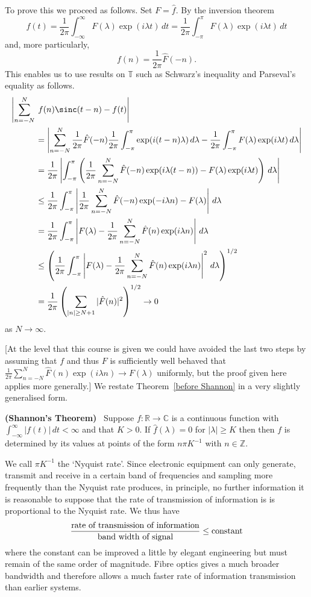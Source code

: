 To prove this we proceed as follows. Set $F=\hat{f}$.
By the inversion theorem
\[f(t)=\frac{1}{2\pi}\int_{-\infty}^{\infty}F(\lambda)\exp(i\lambda t)\,dt
=\frac{1}{2\pi}\int_{-\pi}^{\pi}F(\lambda)\exp(i\lambda t)\,dt\]
and, more particularly,
\[f(n)=\frac{1}{2\pi}\hat{F}(-n).\]
This enables us to use results on ${\mathbb T}$ such as
Schwarz's inequality and Parseval's equality as follows.
\begin{align*}
\left|\sum_{n=-N}^{N}\right.&\left.\vphantom{\sum_{n=-N}^{N}}
f(n)\sinc(t-n)-f(t)\right|\\
&=\left|\sum_{n=-N}^{N}\frac{1}{2\pi}\hat{F}(-n)
\frac{1}{2\pi}\int_{-\pi}^{\pi}\exp(i(t-n)\lambda)\,d\lambda
-\frac{1}{2\pi}\int_{-\pi}^{\pi}F(\lambda)\exp(i\lambda t)\,d\lambda\right|\\
&=\frac{1}{2\pi}\left|\int_{-\pi}^{\pi}
\left(\frac{1}{2\pi}\sum_{n=-N}^{N}\hat{F}(-n)\exp(i\lambda(t-n))
-F(\lambda)\exp(i\lambda t)\right)\,d\lambda\right|\\
&\leq \frac{1}{2\pi}\int_{-\pi}^{\pi}
\left|\frac{1}{2\pi}\sum_{n=-N}^{N}\hat{F}(-n)\exp(-i\lambda n)-F(\lambda)
\right|\,d\lambda\\
&=\frac{1}{2\pi}\int_{-\pi}^{\pi}
\left|F(\lambda)-\frac{1}{2\pi}\sum_{n=-N}^{N}\hat{F}(n)\exp(i\lambda n)
\right|\,d\lambda\\
&\leq\left(
\frac{1}{2\pi}\int_{-\pi}^{\pi}
\left|F(\lambda)-\frac{1}{2\pi}\sum_{n=-N}^{N}\hat{F}(n)\exp(i\lambda n)
\right|^{2}\,d\lambda\right)^{1/2}\\
&=\frac{1}{2\pi}\left(\sum_{|n|\geq N+1}|\hat{F}(n)|^{2}\right)^{1/2}
\rightarrow 0
\end{align*}
as $N\rightarrow\infty$.

[At the level that this course is given we could have avoided
the last two steps by assuming that $f$ and thus $F$ is
sufficiently well behaved that
$\frac{1}{2\pi}\sum_{n=-N}^{N}\hat{F}(n)\exp(i\lambda n)
\rightarrow F(\lambda)$ uniformly, but the proof given here
applies more generally.]
We restate Theorem~\ref{before Shannon} in a very slightly
generalised form.
\begin{theorem}{\bf (Shannon's Theorem)}~\label{Shannon}
Suppose $f:{\mathbb R}\rightarrow{\mathbb C}$
is a continuous function with
$\int_{-\infty}^{\infty}|f(t)|\,dt<\infty$
and that $K>0$.
If $\hat{f}(\lambda)=0$
for $|\lambda|\geq K$
then then $f$ is determined by its values at points of the form
$n\pi K^{-1}$ with $n\in{\mathbb Z}$.
\end{theorem}
We call $\pi K^{-1}$ the `Nyquist rate'. Since
electronic equipment can only generate, transmit
and receive in a certain band of frequencies
and sampling more frequently than the Nyquist
rate produces, in principle, no further information
it is reasonable to suppose that the rate of transmission
of information is is proportional to the Nyquist
rate. We thus have
\[\frac{\text{\rm rate of transmission of information}}
{\text{\rm band width of signal}}\leq\text{\rm constant}\]
where the constant can be improved a little by elegant
engineering but must remain of the same order of magnitude.
Fibre optics gives a much broader bandwidth and therefore
allows a much faster rate of information transmission than earlier
systems.

